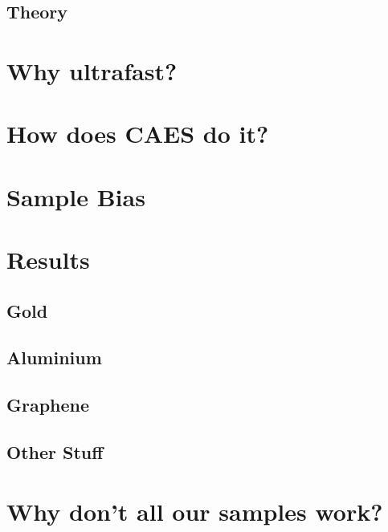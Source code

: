 \subsection{Theory}

\section{Why ultrafast?}

\section{How does CAES do it?}

\section{Sample Bias}\label{section:sample_bias}

\section{Results}

\subsection{Gold}

\subsection{Aluminium}

\subsection{Graphene}

\subsection{Other Stuff}

\section{Why don't all our samples work?}